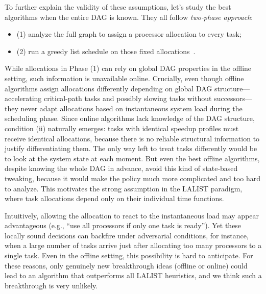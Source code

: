 \documentclass{article}
\begin{document}
To further explain the validity of these assumptions, let's study the best algorithms when the entire DAG is known. They all follow
\emph{two‑phase approach}:
\begin{itemize}
\item (1) analyze the full graph to assign a processor allocation to every task;
\item (2) run a greedy list schedule on those fixed allocations~\cite{Wang92_DAG,Chen13_concave, Lepere01_DAG, Jansen06_DAG}.
\end{itemize}
While allocations in Phase (1) can rely on global DAG properties in the offline setting, such information is unavailable online. Crucially, even though offline algorithms assign allocations differently depending on global DAG structure—accelerating critical-path tasks and possibly slowing tasks without successors—they never adapt allocations based on instantaneous system load during the scheduling phase. Since online algorithms lack knowledge of the DAG structure, condition (ii) naturally emerges: tasks with identical speedup profiles must receive identical allocations, because there is no reliable structural information to justify differentiating them. The only way left to treat tasks differently would be to look at the system state at each moment. But even the best offline algorithms, despite knowing the whole DAG in advance, avoid this kind of state‑based tweaking, because it would make the policy much more complicated and too hard to analyze. This motivates the strong assumption in the \textsc{LALIST} paradigm, where task allocations depend only on their individual time functions.

Intuitively, allowing the allocation to react to the instantaneous load may appear advantageous (e.g., “use all processors if only one task is ready”). Yet these locally sound decisions can backfire under adversarial conditions, for instance, when a large number of tasks arrive just after allocating too many processors to a single task.
Even in the offline setting, this possibility is hard to anticipate. For these reasons, only genuinely new breakthrough ideas (offline or online) could lead to an algorithm that outperforms all \textsc{LALIST} heuristics, and we think such a breakthrough is very unlikely.
\end{document}
